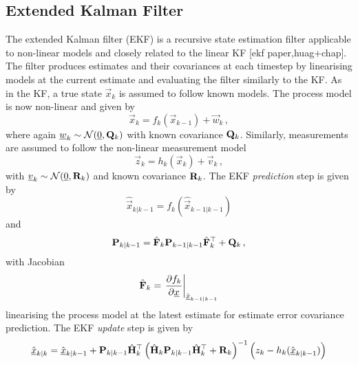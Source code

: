 % 
% 

\subsection{Extended Kalman Filter}\label{subsec:prelims:ekf}
The extended Kalman filter (EKF) is a recursive state estimation filter applicable to non-linear models and closely related to the linear KF [ekf paper,huag+chap]. The filter produces estimates and their covariances at each timestep by linearising models at the current estimate and evaluating the filter similarly to the KF. As in the KF, a true state $\vec{x}_k$ is assumed to follow known models. The process model is now non-linear and given by
\begin{equation}\label{eq:prelims:nonlin_gauss_process_model}
    \vec{x}_k = f_k(\vec{x}_{k-1}) + \vec{w}_k\,,
\end{equation}
where again ${\underline{w}}_k \sim \mathcal{N}({\underline{0}}, {{\mathbf{Q}}}_k)$ with known covariance ${{\mathbf{Q}}}_k$. Similarly, measurements are assumed to follow the non-linear measurement model
\begin{equation}\label{eq:prelims:nonlin_gauss_measurement_model}
    \vec{z}_k = h_k(\vec{x}_k) + \vec{v}_k\,,
\end{equation}
with ${\underline{v}}_k \sim \mathcal{N}({\underline{0}}, {{\mathbf{R}}}_k)$ and known covariance ${{\mathbf{R}}}_k$. The EKF \textit{prediction} step is given by
\begin{equation}\label{eq:prelims:ekf_est_predict}
    \hat{\vec{x}}_{k|k-1} = f_k\left(\hat{\vec{x}}_{k-1|k-1}\right)
\end{equation}
and
\begin{equation}\label{eq:prelims:ekf_cov_predict}
    {\ensuremath{{\mathbf{P}}}}_{k|k-1} = \hat{{{\mathbf{F}}}}_k {{\mathbf{P}}}_{k-1|k-1} \hat{{{\mathbf{F}}}}_k^\top + {{\mathbf{Q}}}_k\,,
\end{equation}
with Jacobian
\begin{equation}\label{eq:prelims:ekf_predict_jacobian}
    \hat{{{\mathbf{F}}}}_k = \left.\frac{\partial f_k}{\partial {\underline{x}}}\right|_{\hat{{\underline{x}}}_{k-1|k-1}}
\end{equation}
linearising the process model at the latest estimate for estimate error covariance prediction. The EKF \textit{update} step is given by
\begin{equation}\label{eq:prelims:ekf_est_update}
    \hat{{\underline{x}}}_{k|k} = \hat{{\underline{x}}}_{k|k-1}+{{\mathbf{P}}}_{k|k-1}\hat{{{\mathbf{H}}}}_k^\top\left(\hat{{{\mathbf{H}}}}_k{{\mathbf{P}}}_{k|k-1}\hat{{{\mathbf{H}}}}_k^\top + {{\mathbf{R}}}_k\right)^{-1}\left(z_k-h_k(\hat{{\underline{x}}}_{k|k-1})\right)
\end{equation}
